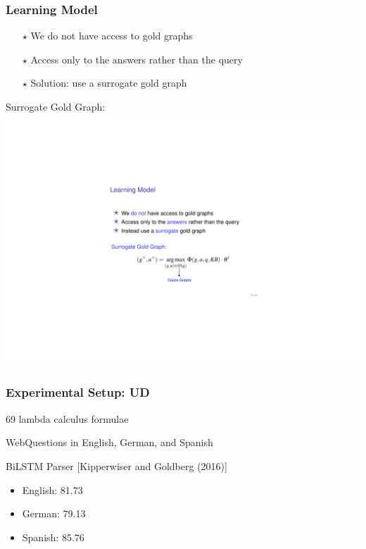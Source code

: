 \documentclass[mathserif,12pt]{beamer}
\newcommand{\hlight}[1]{{\color{blue!80} #1}}
\begin{document}
\begin{frame}
\frametitle{Learning Model}
\large 

\begin{itemize}
 \item[\huge $\star$] We \hlight{do not} have access to gold graphs
 \item[\huge $\star$] Access only to the \hlight{answers} rather than the query
 \item[\huge $\star$] Solution: use a \hlight{surrogate} gold graph
\end{itemize}


\pause
\vspace{0.5cm}
\hlight{Surrogate Gold Graph: }
\includegraphics{figures/perceptron-oracle}

\end{frame}

\begin{frame}
\frametitle{Experimental Setup: UD}
\large
69 lambda calculus formulae

\vspace{2em}
WebQuestions in English, German, and Spanish

\vspace{2em}
BiLSTM Parser {\small [Kipperwiser and Goldberg (2016)]}\\
\begin{itemize}
\item English: 81.73 \\
\item German: 79.13 \\
\item Spanish: 85.76 \\
\end{itemize}
\end{frame}
\end{document}
